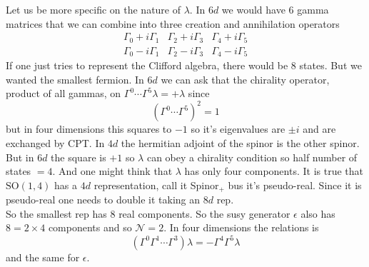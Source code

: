 \documentclass[11pt]{article}
\theoremstyle{definition}
\numberwithin{equation}{section}
\newcommand*\cN{\mathcal{N}}
\newcommand*\SO{\mathrm{SO}}
\begin{document}
Let us be more specific on the nature of $\lambda$. In $6d$ we would have $6$ gamma matrices that we can combine into three creation and annihilation operators
\begin{equation}
\begin{array}{ccc}
	\Gamma_{0}+i\Gamma_{1}&\Gamma_{2}+i\Gamma_{3}&\Gamma_{4}+i\Gamma_{5}\\
	\Gamma_{0}-i\Gamma_{1}&\Gamma_{2}-i\Gamma_{3}&\Gamma_{4}-i\Gamma_{5}	
\end{array}
\end{equation}
If one just tries to represent the Clifford algebra, there would be $8$ states. But we wanted the smallest fermion. In $6d$ we can ask that the chirality operator, product of all gammas, on $\Gamma^{0}\cdots\Gamma^{5}\lambda=+\lambda$ since 
\begin{equation}
	(\Gamma^{0}\cdots\Gamma^{5})^{2}=1
\end{equation}
but in four dimensions this squares to $-1$ so it's eigenvalues are $\pm i$ and are exchanged by CPT. In $4d$ the hermitian adjoint of the spinor is the other spinor. But in $6d$ the square is $+1$ so $\lambda$ can obey a chirality condition so half number of states $=4$. And one might think that $\lambda$ has only four components. It is true that $\SO(1,4)$ has a $4d$ representation, call it Spinor$_{+}$ bus it's pseudo-real. Since it is pseudo-real one needs to double it taking an $8d$ rep.\\
So the smallest rep has $8$ real components. So the susy generator $\epsilon$ also has $8=2\times 4$ components and so $\cN=2$. In four dimensions the relations is 
\begin{equation}
	(\Gamma^{0}\Gamma^{1}\cdots\Gamma^{3})\lambda=-\Gamma^{4}\Gamma^{5}\lambda
\end{equation}
and the same for $\epsilon$.
\end{document}
